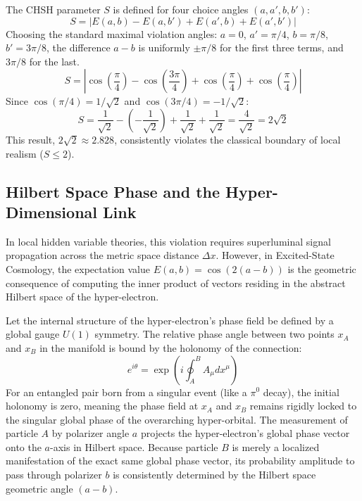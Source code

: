 The CHSH parameter $S$ is defined for four choice angles $(a, a', b, b')$:
\begin{equation}
S = |E(a,b) - E(a,b') + E(a',b) + E(a',b')|
\end{equation}
Choosing the standard maximal violation angles: $a = 0$, $a' = \pi/4$, $b = \pi/8$, $b' = 3\pi/8$, the difference $a-b$ is uniformly $\pm \pi/8$ for the first three terms, and $3\pi/8$ for the last.
\begin{equation}
S = \left| \cos\left(\frac{\pi}{4}\right) - \cos\left(\frac{3\pi}{4}\right) + \cos\left(\frac{\pi}{4}\right) + \cos\left(\frac{\pi}{4}\right) \right|
\end{equation}
Since $\cos(\pi/4) = 1/\sqrt{2}$ and $\cos(3\pi/4) = -1/\sqrt{2}$:
\begin{equation}
S = \frac{1}{\sqrt{2}} - \left(-\frac{1}{\sqrt{2}}\right) + \frac{1}{\sqrt{2}} + \frac{1}{\sqrt{2}} = \frac{4}{\sqrt{2}} = 2\sqrt{2}
\end{equation}
This result, $2\sqrt{2} \approx 2.828$, consistently violates the classical boundary of local realism ($S \le 2$). 

\subsection{Hilbert Space Phase and the Hyper-Dimensional Link}
In local hidden variable theories, this violation requires superluminal signal propagation across the metric space distance $\Delta x$. However, in Excited-State Cosmology, the expectation value $E(a,b) = \cos(2(a-b))$ is the geometric consequence of computing the inner product of vectors residing in the abstract Hilbert space of the hyper-electron. 

Let the internal structure of the hyper-electron's phase field be defined by a global gauge $U(1)$ symmetry. The relative phase angle between two points $x_A$ and $x_B$ in the manifold is bound by the holonomy of the connection:
\begin{equation}
e^{i\theta} = \exp\left( i \oint_{A}^{B} A_\mu dx^\mu \right)
\end{equation}
For an entangled pair born from a singular event (like a $\pi^0$ decay), the initial holonomy is zero, meaning the phase field at $x_A$ and $x_B$ remains rigidly locked to the singular global phase of the overarching hyper-orbital. The measurement of particle $A$ by polarizer angle $a$ projects the hyper-electron's global phase vector onto the $a$-axis in Hilbert space. Because particle $B$ is merely a localized manifestation of the exact same global phase vector, its probability amplitude to pass through polarizer $b$ is consistently determined by the Hilbert space geometric angle $(a-b)$.

